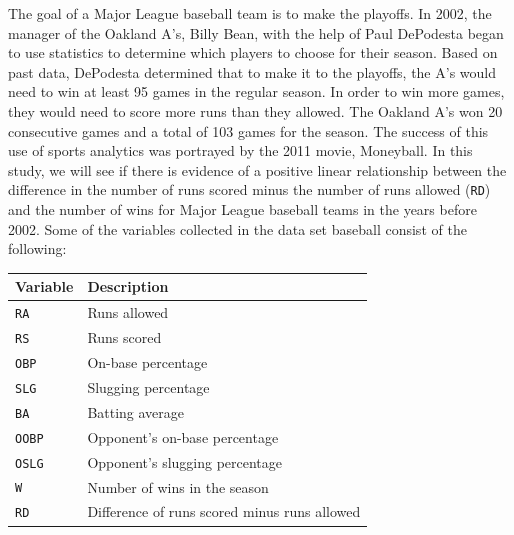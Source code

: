\documentclass[
]{report}
\newenvironment{Shaded}{\begin{snugshade}}{\end{snugshade}}
\newcommand{\CommentTok}[1]{\textcolor[rgb]{0.56,0.35,0.01}{\textit{#1}}}
\newcommand{\DecValTok}[1]{\textcolor[rgb]{0.00,0.00,0.81}{#1}}
\newcommand{\FunctionTok}[1]{\textcolor[rgb]{0.13,0.29,0.53}{\textbf{#1}}}
\newcommand{\NormalTok}[1]{#1}
\newcommand{\OtherTok}[1]{\textcolor[rgb]{0.56,0.35,0.01}{#1}}
\newcommand{\SpecialCharTok}[1]{\textcolor[rgb]{0.81,0.36,0.00}{\textbf{#1}}}
\newcommand{\StringTok}[1]{\textcolor[rgb]{0.31,0.60,0.02}{#1}}
\begin{document}
The goal of a Major League baseball team is to make the playoffs. In 2002, the manager of the Oakland A's, Billy Bean, with the help of Paul DePodesta began to use statistics to determine which players to choose for their season. Based on past data, DePodesta determined that to make it to the playoffs, the A's would need to win at least 95 games in the regular season. In order to win more games, they would need to score more runs than they allowed. The Oakland A's won 20 consecutive games and a total of 103 games for the season. The success of this use of sports analytics was portrayed by the 2011 movie, Moneyball. In this study, we will see if there is evidence of a positive linear relationship between the difference in the number of runs scored minus the number of runs allowed (\texttt{RD}) and the number of wins for Major League baseball teams in the years before 2002. Some of the variables collected in the data set baseball consist of the following:

\begin{longtable}[]{@{}ll@{}}
\toprule\noalign{}
\textbf{Variable} & \textbf{Description} \\
\midrule\noalign{}
\endhead
\bottomrule\noalign{}
\endlastfoot
\texttt{RA} & Runs allowed \\
\texttt{RS} & Runs scored \\
\texttt{OBP} & On-base percentage \\
\texttt{SLG} & Slugging percentage \\
\texttt{BA} & Batting average \\
\texttt{OOBP} & Opponent's on-base percentage \\
\texttt{OSLG} & Opponent's slugging percentage \\
\texttt{W} & Number of wins in the season \\
\texttt{RD} & Difference of runs scored minus runs allowed \\
\end{longtable}

\begin{Shaded}
\end{Shaded}
\end{document}
